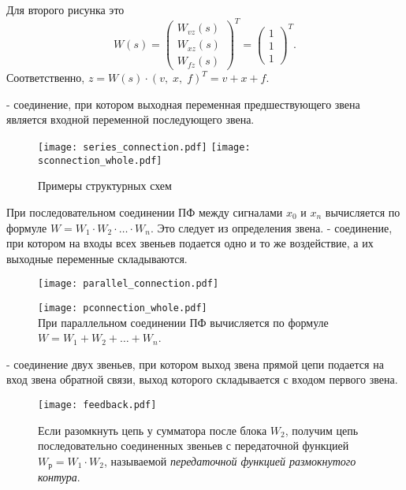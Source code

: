 \documentclass[../../TAU.tex]{subfiles}
\begin{document}
    Для второго рисунка это
    $$
        W(s) =
        \begin{pmatrix}
            W_{vz}(s)\\
            W_{xz}(s)\\
            W_{fz}(s)
        \end{pmatrix}^T =
        \begin{pmatrix}
            1\\
            1\\
            1
        \end{pmatrix}^T.
    $$
    Соответственно, 
    ${z = W(s) \cdot (v,\; x,\; f)^T= v+x+f}$.

     - соединение, при котором выходная переменная предшествующего звена является входной переменной последующего звена.
    \begin{figure}[h]
        \centering
        \texttt{[image: series\_connection.pdf]}
        \texttt{[image: sconnection\_whole.pdf]}
        \caption{Примеры структурных схем}
        \centering
    \end{figure}
    При последовательном соединении ПФ между сигналами $x_0$ и $x_n$ вычисляется по формуле 
    ${W = W_1\cdot W_2\cdot \ldots\cdot W_n}$. Это следует из определения звена.
     - соединение, при котором на входы всех звеньев подается одно и то же воздействие, а их выходные переменные складываются.
    \begin{figure}[h]
        \begin{minipage}[h]{0.39\linewidth}
            \texttt{[image: parallel\_connection.pdf]}
        \end{minipage}
        \begin{minipage}[h]{0.59\linewidth}
            \texttt{[image: pconnection\_whole.pdf]}\\
            При параллельном соединении ПФ вычисляется по формуле 
            ${W = W_1+W_2+\ldots + W_n}$.
        \end{minipage}
    \end{figure}
     - соединение двух звеньев, при котором выход звена прямой цепи подается на вход звена обратной связи, выход которого складывается с входом первого звена.
    \begin{figure}[h]
        \begin{minipage}[h]{0.39\linewidth}
            \texttt{[image: feedback.pdf]}
        \end{minipage}
        \begin{minipage}[h]{0.60\linewidth}
            Если разомкнуть цепь у сумматора после блока $W_2$, получим цепь последовательно соединенных звеньев с передаточной функцией 
            ${W_{\text{р}} = W_1 \cdot W_2}$, 
            называемой {\it передаточной функцией размокнутого контура}.
        \end{minipage}
    \end{figure}
\end{document}
